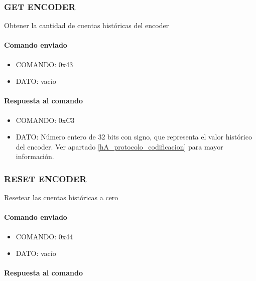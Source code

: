 \subsubsection{GET ENCODER}
\label{hA_protocolo_get_encoder}

Obtener la cantidad de cuentas hist\'oricas del encoder

\paragraph*{Comando enviado}

\begin{itemize}
	\item{COMANDO:} 0x43
	\item{DATO:} vac\'io
\end{itemize}

\paragraph*{Respuesta al comando}

\begin{itemize}
	\item{COMANDO:} 0xC3
	\item{DATO:} N\'umero entero de 32 bits con signo, que representa el valor hist\'orico del encoder.
		Ver apartado \ref{hA_protocolo_codificacion} para mayor informaci\'on.
\end{itemize}

\subsubsection{RESET ENCODER}
\label{hA_protocolo_reset_encoder}

Resetear las cuentas hist\'oricas a cero

\paragraph*{Comando enviado}

\begin{itemize}
	\item{COMANDO:} 0x44
	\item{DATO:} vac\'io
\end{itemize}

\paragraph*{Respuesta al comando}

